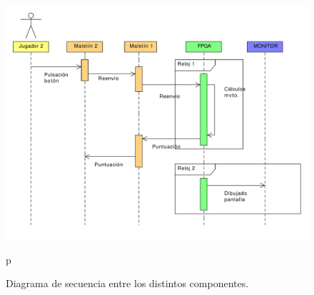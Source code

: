 \begin{figure}[h]
  \centering
  \includegraphics[width=1.0\textwidth]{images/secuencia.pdf}
  \caption{Diagrama de secuencia entre los distintos componentes.}
  \label{s2:fig:secuencia}
p\end{figure}



%
%


